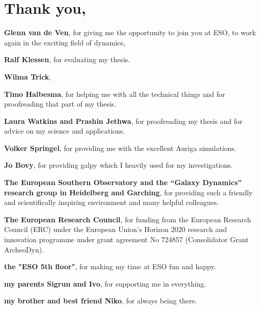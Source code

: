\section*{Thank you,}

\textbf{Glenn van de Ven}, for giving me the opportunity to join you at ESO, to work again in the exciting field of dynamics, 

\textbf{Ralf Klessen}, for evaluating my thesis.

\textbf{Wilma Trick},

\textbf{Timo Halbesma}, for helping me with all the technical things and for proofreading that part of my thesis.

\textbf{Laura Watkins and Prashin Jethwa}, for proofreading my thesis and for advice on my science and applications.

\textbf{Volker Springel}, for providing me with the excellent Auriga simulations.

\textbf{Jo Bovy}, for providing galpy which I heavily used for my investigations.

\textbf{The European Southern Observatory and the “Galaxy Dynamics” research group in Heidelberg and Garching}, for providing such a friendly and scientifically inspiring environment and many helpful colleagues.

\textbf{The European Research Council}, for funding from the European Research Council (ERC) under the European Union's Horizon 2020 research and innovation programme under grant agreement No 724857 (Consolidator Grant ArcheoDyn).

\textbf{the "ESO 5th floor"}, for making my time at ESO fun and happy.

\textbf{my parents Sigrun and Ivo}, for supporting me in everything.

\textbf{my brother and best friend Niko}, for always being there.